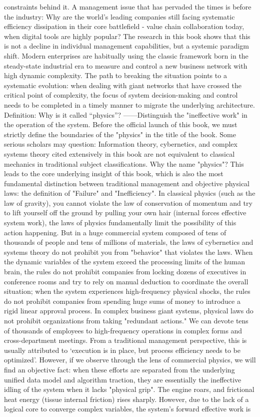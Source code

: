 \documentclass[11pt,a4paper]{article}
\begin{document}
constraints behind it. A management issue that has pervaded the times is before the industry: Why are the world's leading companies still facing systematic efficiency dissipation in their core battlefield - value chain collaboration today, when digital tools are highly popular? The research in this book shows that this is not a decline in individual management capabilities, but a systemic paradigm shift. Modern enterprises are habitually using the classic framework born in the steady-state industrial era to measure and control a new business network with high dynamic complexity. The path to breaking the situation points to a systematic evolution: when dealing with giant networks that have crossed the critical point of complexity, the focus of system decision-making and control needs to be completed in a timely manner to migrate the underlying architecture. Definition: Why is it called “physics”? ——Distinguish the "ineffective work" in the operation of the system. Before the official launch of this book, we must strictly define the boundaries of the "physics" in the title of the book. Some serious scholars may question: Information theory, cybernetics, and complex systems theory cited extensively in this book are not equivalent to classical mechanics in traditional subject classifications. Why the name "physics"? This leads to the core underlying insight of this book, which is also the most fundamental distinction between traditional management and objective physical laws: the definition of "Failure" and "Inefficiency". In classical physics (such as the law of gravity), you cannot violate the law of conservation of momentum and try to lift yourself off the ground by pulling your own hair (internal forces effective system work), the laws of physics fundamentally limit the possibility of this action happening. But in a huge commercial system composed of tens of thousands of people and tens of millions of materials, the laws of cybernetics and systems theory do not prohibit you from "behavior" that violates the laws. When the dynamic variables of the system exceed the processing limits of the human brain, the rules do not prohibit companies from locking dozens of executives in conference rooms and try to rely on manual deduction to coordinate the overall situation; when the system experiences high-frequency physical shocks, the rules do not prohibit companies from spending huge sums of money to introduce a rigid linear approval process. In complex business giant systems, physical laws do not prohibit organizations from taking "redundant actions." We can devote tens of thousands of employees to high-frequency operations in complex forms and cross-department meetings. From a traditional management perspective, this is usually attributed to ‘execution is in place, but process efficiency needs to be optimized’. However, if we observe through the lens of commercial physics, we will find an objective fact: when these efforts are separated from the underlying unified data model and algorithm traction, they are essentially the ineffective idling of the system when it lacks "physical grip". The engine roars, and frictional heat energy (tissue internal friction) rises sharply. However, due to the lack of a logical core to converge complex variables, the system's forward effective work is 
\end{document}

